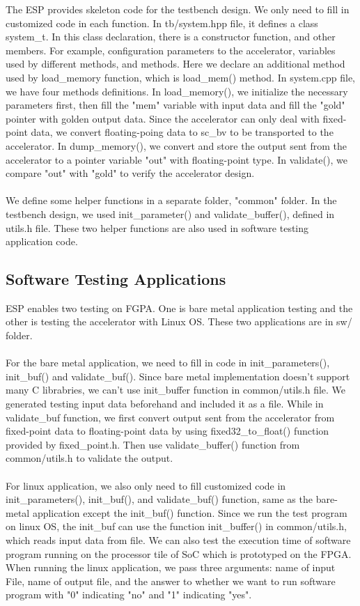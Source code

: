 The ESP provides skeleton code for the testbench design. We only need to fill in
customized code in each function. In tb/system.hpp file, it defines a class
system\_t. In this class declaration, there is a constructor function, and other
members. For example, configuration parameters to the accelerator, variables
used by different methods, and methods. Here we declare an additional method
used by load\_memory function, which is load\_mem() method. In system.cpp file,
we have four methods definitions. In load\_memory(), we initialize the necessary
parameters first, then fill the "mem" variable with input data and fill the
"gold" pointer with golden output data. Since the accelerator can only deal with
fixed-point data, we convert floating-poing data to sc\_bv to be transported to
the accelerator. In dump\_memory(), we convert and store the output sent from
the accelerator to a pointer variable "out" with floating-point type. In
validate(), we compare "out" with "gold" to verify the accelerator
design. \\ \\ We define some helper functions in a separate folder, "common"
folder. In the testbench design, we used init\_parameter() and
validate\_buffer(), defined in utils.h file. These two helper functions are also
used in software testing application code.\\

\subsection{Software Testing Applications}

ESP enables two testing on FGPA. One is bare metal application testing and the
other is testing the accelerator with Linux OS. These two applications are in
sw/ folder. \\ \\ For the bare metal application, we need to fill in code in
init\_parameters(), init\_buf() and validate\_buf(). Since bare metal
implementation doesn't support many C librabries, we can't use init\_buffer
function in common/utils.h file. We generated testing input data beforehand and
included it as a file. While in validate\_buf function, we first convert output
sent from the accelerator from fixed-point data to floating-point data by using
fixed32\_to\_float() function provided by fixed\_point.h. Then use
validate\_buffer() function from common/utils.h to validate the
output. \\ \\ For linux application, we also only need to fill customized code
in init\_parameters(), init\_buf(), and validate\_buf() function, same as the
bare-metal application except the init\_buf() function. Since we run the test
program on linux OS, the init\_buf can use the function init\_buffer() in
common/utils.h, which reads input data from file. We can also test the execution
time of software program running on the processor tile of SoC which is
prototyped on the FPGA. When running the linux application, we pass three
arguments: name of input File, name of output file, and the answer to whether we
want to run software program with "0" indicating "no" and "1" indicating "yes".
\\
